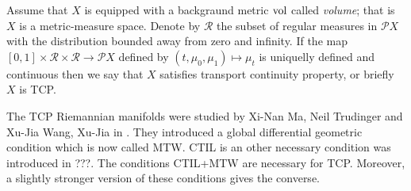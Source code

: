 Assume that $X$ is equipped with a backgraund metric $\text{\rm vol}$ called \emph{volume};
that is $X$ is a metric-measure space.
Denote by $\mathcal{R}$ the subset of regular measures in $\mathcal{P}X$ with the distribution bounded away from zero and infinity.
If the map $[0,1]\times\mathcal{R}\times\mathcal{R}\to \mathcal{P}X$ defined by $(t,\mu_0,\mu_1)\mapsto \mu_t$ is uniquelly defined and continuous then we say that $X$ satisfies transport continuity property, or briefly $X$ is TCP.

The TCP Riemannian manifolds were studied by 
Xi-Nan Ma, Neil Trudinger and Xu-Jia Wang, Xu-Jia in \cite{MTW}.
They introduced a global differential geometric condition which is now called MTW.
CTIL is an other necessary condition was introduced in ???.
The conditions CTIL+MTW are necessary for TCP.
Moreover, a slightly stronger version of these conditions gives the converse.
